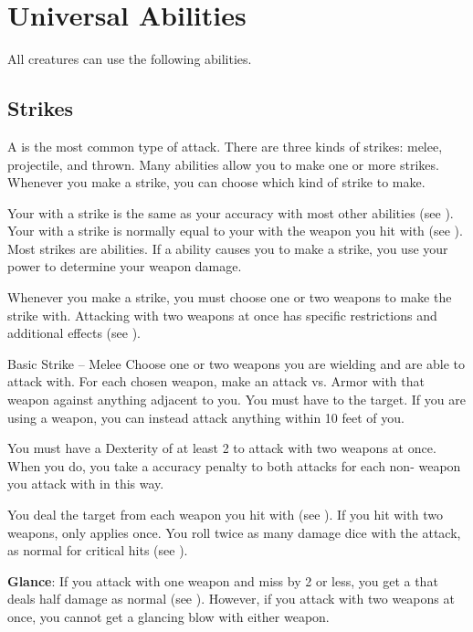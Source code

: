 \section{Universal Abilities}\label{Universal Abilities}
    All creatures can use the following abilities.

    \subsection{Strikes}\label{Strikes}
        A  is the most common type of attack.
        There are three kinds of strikes: melee, projectile, and thrown.
        Many abilities allow you to make one or more strikes.
        Whenever you make a strike, you can choose which kind of strike to make.

        Your  with a strike is the same as your accuracy with most other abilities (see ).
        Your  with a strike is normally equal to your  with the weapon you hit with (see ).
        Most strikes are  abilities.
        If a \magical ability causes you to make a strike, you use your \magical power to determine your weapon damage.

        Whenever you make a strike, you must choose one or two weapons to make the strike with.
        Attacking with two weapons at once has specific restrictions and additional effects (see ).

        \begin{activeability}{Basic Strike -- Melee}
            \label{Melee Strike}
            \rankline
            Choose one or two weapons you are wielding and are able to attack with.
            For each chosen weapon, make an attack vs. Armor with that weapon against anything adjacent to you.
            You must have  to the target.
            If you are using a  weapon, you can instead attack anything within 10 feet of you.

            You must have a Dexterity of at least 2 to attack with two weapons at once.
            When you do, you take a  accuracy penalty to both attacks for each non- weapon you attack with in this way.

            \hit You deal the target  from each weapon you hit with (see ).
            If you hit with two weapons,  only applies once.
            \crit You roll twice as many damage dice with the attack, as normal for critical hits (see ).
            \par \textbf{Glance}: If you attack with one weapon and miss by 2 or less, you get a  that deals half damage as normal (see ).
            However, if you attack with two weapons at once, you cannot get a glancing blow with either weapon.
        \end{activeability}

